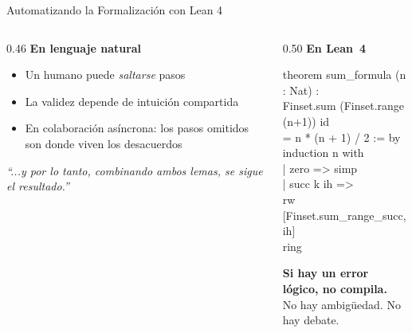 \documentclass[aspectratio=169, 10pt]{beamer}
\begin{document}
\begin{frame}{Automatizando la Formalización con Lean 4}
  \begin{columns}[T]
    \begin{column}{0.46\textwidth}
      \textbf{\color{cpGray}En lenguaje natural}
      \vspace{0.2cm}
      \begin{itemize}\small
        \item Un humano puede \emph{saltarse} pasos
        \item La validez depende de intuici\'{o}n compartida
        \item En colaboraci\'{o}n as\'{i}ncrona: los pasos omitidos son donde viven los desacuerdos
      \end{itemize}
      \vspace{0.3cm}
      {\footnotesize\color{cpGray}\textit{\textquotedblleft{}...y por lo tanto,
      combinando ambos lemas, se sigue el resultado.\textquotedblright{}}}
    \end{column}
    \begin{column}{0.50\textwidth}
      \textbf{\color{leanpurple}En Lean~4}
      \vspace{0.2cm}

      \colorbox{cpBlue!5}{\parbox{\linewidth}{%
        \ttfamily\footnotesize\color{leanpurple}
        theorem sum\_formula (n : Nat) :\\[1pt]
        \hspace*{0.8em}Finset.sum (Finset.range (n+1)) id\\[1pt]
        \hspace*{0.8em}= n * (n + 1) / 2 := by\\[1pt]
        \hspace*{0.4em}induction n with\\[1pt]
        \hspace*{0.4em}| zero => simp\\[1pt]
        \hspace*{0.4em}| succ k ih =>\\[1pt]
        \hspace*{1.2em}rw [Finset.sum\_range\_succ, ih]\\[1pt]
        \hspace*{1.2em}ring
      }}\par\vspace{0.25cm}
      {\small\color{cpBlue}\textbf{Si hay un error l\'{o}gico, no compila.}\\
      No hay ambig\"{u}edad. No hay debate.}
    \end{column}
  \end{columns}
\end{frame}
\end{document}
